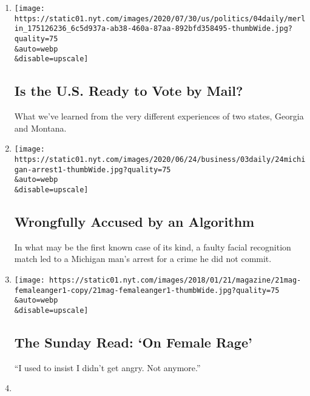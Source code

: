 \begin{enumerate}
\def\labelenumi{\arabic{enumi}.}
\item
  \href{/2020/08/04/podcasts/the-daily/mail-in-voting-president-trump.html}{}

  \texttt{[image: https://static01.nyt.com/images/2020/07/30/us/politics/04daily/merlin\_175126236\_6c5d937a-ab38-460a-87aa-892bfd358495-thumbWide.jpg?quality=75\\\&auto=webp\\\&disable=upscale]}

  \hypertarget{is-the-us-ready-to-vote-by-mail}{%
  \subsection{Is the U.S. Ready to Vote by
  Mail?}\label{is-the-us-ready-to-vote-by-mail}}

  What we've learned from the very different experiences of two states,
  Georgia and Montana.
\item
  \href{/2020/08/03/podcasts/the-daily/algorithmic-justice-racism.html}{}

  \texttt{[image: https://static01.nyt.com/images/2020/06/24/business/03daily/24michigan-arrest1-thumbWide.jpg?quality=75\\\&auto=webp\\\&disable=upscale]}

  \hypertarget{wrongfully-accused-by-an-algorithm}{%
  \subsection{Wrongfully Accused by an
  Algorithm}\label{wrongfully-accused-by-an-algorithm}}

  In what may be the first known case of its kind, a faulty facial
  recognition match led to a Michigan man's arrest for a crime he did
  not commit.
\item
  \href{/2020/08/02/podcasts/the-daily/on-female-rage.html}{}

  \texttt{[image: https://static01.nyt.com/images/2018/01/21/magazine/21mag-femaleanger1-copy/21mag-femaleanger1-thumbWide.jpg?quality=75\\\&auto=webp\\\&disable=upscale]}

  \hypertarget{the-sunday-read-on-female-rage}{%
  \subsection{The Sunday Read: `On Female
  Rage'}\label{the-sunday-read-on-female-rage}}

  ``I used to insist I didn't get angry. Not anymore.''
\item
  \href{/2020/07/31/podcasts/the-daily/vanessa-guillen-military-metoo.html}{}


\end{enumerate}
